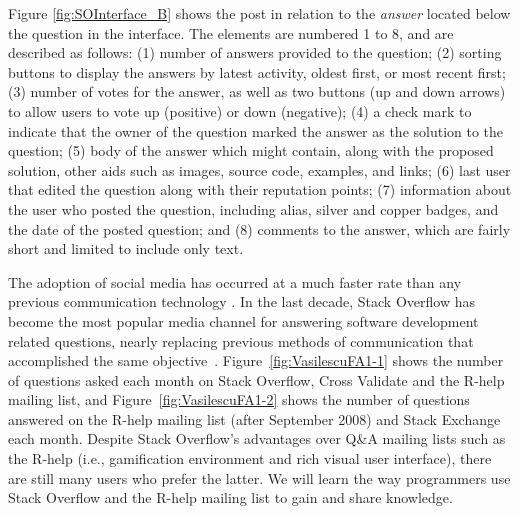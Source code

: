 \documentclass{sig-alternate-05-2015}
\begin{document}
	Figure \ref{fig:SOInterface_B} shows the post in relation to the \textit{answer} located below the question in the interface.
	The elements are numbered 1 to 8, and are described as follows:
	(1) number of answers provided to the question;
	(2) sorting buttons to display the answers by latest activity, oldest first, or most recent first;
	(3) number of votes for the answer, as well as two buttons (up and down arrows) to allow users to vote up (positive) or down (negative);
	(4) a check mark to indicate that the owner of the question marked the answer as the solution to the question;
	(5) body of the answer which might contain, along with the proposed solution, other aids such as images, source code, examples, and links;
	(6)	last user that edited the question along with their reputation points;
	(7) information about the user who posted the question, including alias, silver and copper badges, and the date of the posted question;
	and (8) comments to the answer, which are fairly short and limited to include only text.

	The adoption of social media has occurred at a much faster rate than any previous communication technology \cite{Chui2012}.
	In the last decade, Stack Overflow has become the most popular media channel for answering software development related questions, nearly replacing previous methods of communication that accomplished the same objective~\cite{Vasilescu2014c}.
	Figure~\ref{fig:VasilescuFA1-1} shows the number of questions asked each month on Stack Overflow, Cross Validate and the R-help mailing list, and Figure~\ref{fig:VasilescuFA1-2} shows the number of questions answered on the R-help mailing list (after September 2008) and Stack Exchange each month.
	Despite Stack Overflow's advantages over Q\&A mailing lists such as the R-help (i.e., gamification environment and rich visual user interface), there are still many users who prefer the latter.
	We will learn the way programmers use Stack Overflow and the R-help mailing list to gain and share knowledge.
\end{document}
